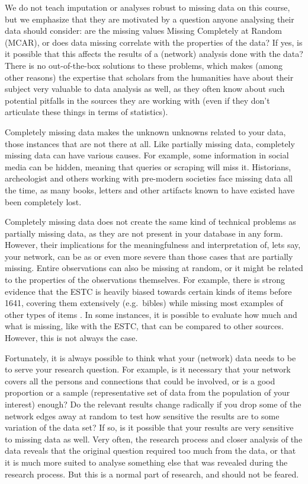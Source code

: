 \documentclass[
]{book}
\begin{document}
We do not teach imputation or analyses robust to missing data on this course, but we emphasize that they are motivated by a question anyone analysing their data should consider: are the missing values Missing Completely at Random (MCAR), or does data missing correlate with the properties of the data? If yes, is it possible that this affects the results of a (network) analysis done with the data? There is no out-of-the-box solutions to these problems, which makes (among other reasons) the expertise that scholars from the humanities have about their subject very valuable to data analysis as well, as they often know about such potential pitfalls in the sources they are working with (even if they don't articulate these things in terms of statistics).

Completely missing data makes the unknown unknowns related to your data, those instances that are not there at all. Like partially missing data, completely missing data can have various causes. For example, some information in social media can be hidden, meaning that queries or scraping will miss it. Historians, archeologist and others working with pre-modern societies face missing data all the time,
as many books, letters and other artifacts known to have existed have been completely lost.

Completely missing data does not create the same kind of technical problems as partially missing data, as they are not present in your database in any form. However, their implications for the meaningfulness and interpretation of, lets say, your network, can be as or even more severe than those cases that are partially missing. Entire observations can also be missing at random, or it might be related to the properties of the observations themselves. For example, there is strong evidence that the ESTC is heavily biased towards certain kinds of items before 1641, covering them extensively (e.g.~bibles) while missing most examples of other types of items \citep{Hill2016}. In some instances, it is possible to evaluate how much and what is missing, like with the ESTC, that can be compared to other sources. However, this is not always the case.

Fortunately, it is always possible to think what your (network) data needs to be to serve your research question. For example, is it necessary that your network covers all the persons and connections that could be involved, or is a good proportion or a sample (representative set of data from the population of your interest) enough? Do the relevant results change radically if you drop some of the network edges away at random to test how sensitive the results are to some variation of the data set? If so, is it possible that your results are very sensitive to missing data as well. Very often, the research process and closer analysis of the data reveals that the original question required too much from the data, or that it is much more suited to analyse something else that was revealed during the research process. But this is a normal part of research, and should not be feared.
\end{document}
